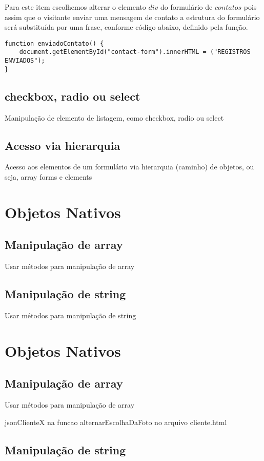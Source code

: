	Para este item escolhemos alterar o elemento $div$ do formulário de $contatos$ pois assim que o visitante enviar uma mensagem de contato a estrutura do formulário será substituída por uma frase, conforme código abaixo, definido pela função.

\begin{lstlisting}
function enviadoContato() {
    document.getElementById("contact-form").innerHTML = ("REGISTROS ENVIADOS");
}
\end{lstlisting}


\subsection{checkbox, radio ou select}
Manipulação de elemento de listagem, como checkbox, radio ou select


\subsection{Acesso via hierarquia}
Acesso aos elementos de um formulário via hierarquia (caminho) de objetos, ou seja, array forms e elements



\section{Objetos Nativos }
\subsection{Manipulação de array}
Usar métodos para manipulação de array
\subsection{Manipulação de string}
Usar métodos para manipulação de string

\section{Objetos Nativos}
\subsection{Manipulação de array}
Usar métodos para manipulação de array

jsonClienteX na funcao alternarEscolhaDaFoto no arquivo cliente.html



\subsection{Manipulação de string}


